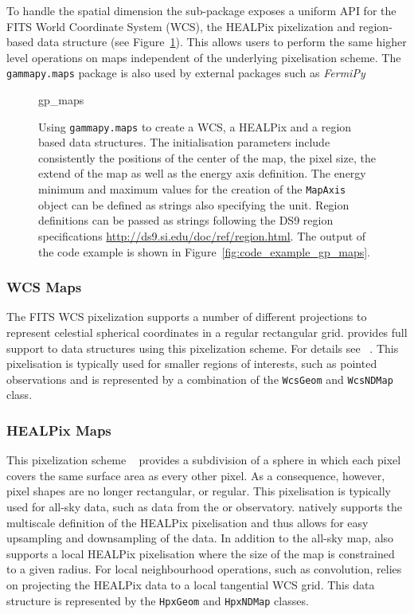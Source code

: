 \documentclass[longauth]{aa}
\newcommand{\code}[1]{\texttt{#1}}
\begin{document}
To handle the spatial dimension the sub-package exposes a uniform API for
the FITS World Coordinate System (WCS), the HEALPix pixelization and
region-based data structure (see Figure~\ref{fig*:minted:gp_maps}).
This allows users to perform the same higher level operations on maps
independent of the underlying pixelisation scheme. The \code{gammapy.maps}
package is also used by external packages such as \textit{FermiPy}~\citep{Wood2017}

\begin{figure}
	\small
	{gp_maps}

	\caption{
        Using \code{gammapy.maps} to create a WCS, a HEALPix and a region
		based data structures. The initialisation parameters include
        consistently the positions of the center of the map, the pixel
        size, the extend of the map as well as the energy axis definition.
        The energy minimum and maximum values for the creation of the
        \code{MapAxis} object can be defined as strings also specifying the
        unit. Region definitions can be passed as strings following
        the DS9 region specifications \url{http://ds9.si.edu/doc/ref/region.html}. The output
		of the code example is shown in Figure~\ref{fig:code_example_gp_maps}.
        }
    \label{fig*:minted:gp_maps}
\end{figure}

\subsubsection{WCS Maps}
The FITS WCS pixelization supports a number of different projections to
represent celestial spherical coordinates in a regular rectangular grid.
\gammapy provides full support to data structures using this pixelization
scheme. For details see ~\cite{Calabretta2002}. This pixelisation
is typically used for smaller regions of interests, such as pointed
observations and is represented by a combination of the
\code{WcsGeom} and \code{WcsNDMap} class.


\subsubsection{HEALPix Maps}
This pixelization scheme ~\citep{Calabretta2002} provides a
subdivision of a sphere in which each pixel covers the same surface area as
every other pixel. As a consequence, however, pixel shapes are no longer
rectangular, or regular.
This pixelisation is typically used for all-sky data, such as data
from the \hawc or \fermi observatory. \gammapy natively supports
the multiscale definition of the HEALPix pixelisation and thus
allows for easy upsampling and downsampling of the data. In addition to
the all-sky map, \gammapy also supports a local HEALPix
pixelisation where the size of the map is constrained to a given
radius.
For local neighbourhood operations, such as convolution, \gammapy relies
on projecting the HEALPix data to a local tangential WCS grid.
This data structure is represented by the \code{HpxGeom} and \code{HpxNDMap}
classes. 
\end{document}
